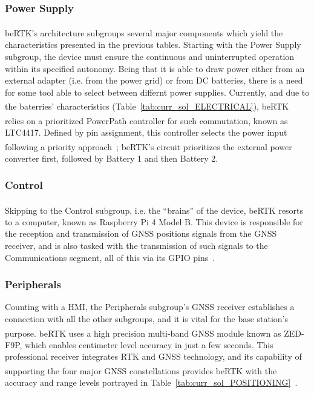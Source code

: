 \subsubsection{Power Supply}\label{sec:II_architecture_PowerSupply}

beRTK\textsuperscript{\textregistered}'s architecture subgroups several major components which yield the characteristics presented in the previous tables. Starting with the Power Supply subgroup, the device must ensure the continuous and uninterrupted operation within its specified autonomy. Being that it is able to draw power either from an external adapter (i.e. from the power grid) or from DC batteries, there is a need for some tool able to select between differnt power supplies. Currently, and due to the baterries' characteristics (Table~\ref{tab:curr_sol_ELECTRICAL}), beRTK\textsuperscript{\textregistered} relies on a prioritized PowerPath\textsuperscript{\texttrademark} controller for such commutation, known as LTC4417. Defined by pin assignment, this controller selects the power input following a priority approach~\cite{LTC4417}; beRTK\textsuperscript{\textregistered}'s circuit prioritizes the external power converter first, followed by Battery 1 and then Battery 2.

\subsubsection{Control}\label{sec:II_architecture_Control}

Skipping to the Control subgroup, i.e. the ``brains'' of the device, beRTK\textsuperscript{\textregistered} resorts to a computer, known as Raspberry Pi 4 Model B. This device is responsible for the reception and transmission of GNSS positions signals from the GNSS receiver, and is also tasked with the transmission of such signals to the Communications segment, all of this via its \gls{GPIO} pins~\cite{RPi4B}.

\subsubsection{Peripherals}\label{sec:II_architecture_Peripherals}

Counting with a HMI, the Peripherals subgroup's GNSS receiver establishes a connection with all the other subgroups, and it is vital for the base station's purpose. beRTK\textsuperscript{\textregistered} uses a high precision multi-band GNSS module known as ZED-F9P, which enables centimeter level accuracy in just a few seconds. This professional receiver integrates RTK and GNSS technology, and its capability of supporting the four major GNSS constellations provides beRTK\textsuperscript{\textregistered} with the accuracy and range levels portrayed in Table~\ref{tab:curr_sol_POSITIONING}~\cite{ZED_F9P}.

